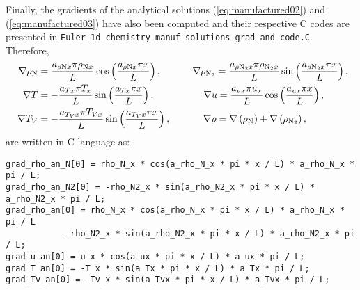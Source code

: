 \documentclass[10pt]{article}
\begin{document}
Finally, the gradients of the analytical solutions (\ref{eq:manufactured02}) and (\ref{eq:manufactured03}) have also been computed and their respective C codes are presented in  \texttt{Euler\_1d\_chemistry\_manuf\_solutions\_grad\_and\_code.C}. Therefore,
\begin{equation}
\begin{split}
\nabla \rho_{\text{N}} &=  \dfrac{ a_{ \rho \text{N} x} \pi \rho_{\text{N}x} }{L} \cos\left( \dfrac{ a_{\rho \text{N} x} \pi x }{L}\right),
\quad\quad\quad\,
\nabla \rho_{\text{N}_2} =  \dfrac{ a_{ \rho \text{N}_2 x} \pi \rho_{\text{N}_2 x} }{L} \sin\left( \dfrac{ a_{ \rho \text{N}_2 x} \pi x }{L}\right),\vspace{10pt}\\
\quad
%
\nabla T &=- \dfrac{ a_{Tx} \pi T_x }{L} \sin\left( \dfrac{ a_{Tx} \pi x }{L}\right),
\quad\qquad\qquad
%
\nabla u = \dfrac{ a_{ux} \pi u_x}{L} \cos\left( \dfrac{ a_{ux} \pi x }{L}\right),
\vspace{10pt}\\
%
\nabla T_V &= - \dfrac{ a_{T_V x} \pi T_{Vx} }{L} \sin\left( \dfrac{ a_{T_Vx} \pi x }{L}\right),
\quad\quad\quad\,\,
%
\nabla \rho =\nabla \left( \rho_\text{N}\right) + \nabla \left(\rho_{\text{N}_2} \right),
\end{split}
\end{equation}
 are written in C language as:




\begin{small}
	

\begin{verbatim}
grad_rho_an_N[0] = rho_N_x * cos(a_rho_N_x * pi * x / L) * a_rho_N_x * pi / L;
grad_rho_an_N2[0] = -rho_N2_x * sin(a_rho_N2_x * pi * x / L) * a_rho_N2_x * pi / L;
grad_rho_an[0] = rho_N_x * cos(a_rho_N_x * pi * x / L) * a_rho_N_x * pi / L 
	       - rho_N2_x * sin(a_rho_N2_x * pi * x / L) * a_rho_N2_x * pi / L;
grad_u_an[0] = u_x * cos(a_ux * pi * x / L) * a_ux * pi / L;
grad_T_an[0] = -T_x * sin(a_Tx * pi * x / L) * a_Tx * pi / L;
grad_Tv_an[0] = -Tv_x * sin(a_Tvx * pi * x / L) * a_Tvx * pi / L;
\end{verbatim}


\end{small}

%
 



\appendix


\end{document}
